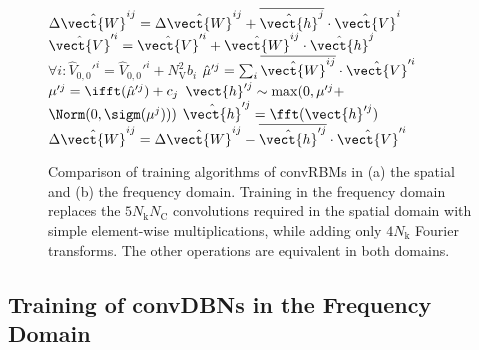 \begin{figure}[t!]
{\begin{minipage}{0.495\linewidth}
\begin{algorithm}[H]
{{     {
      $\Delta\hat{\vect{W}}^{ij} = \Delta\hat{\vect{W}}^{ij} +
      \overline{\hat{\vect{h}}^j} \cdot \hat{\vect{V}}^i$\;
      $\hat{\vect{V}}'^i = \hat{\vect{V}}'^i + \hat{\vect{W}}^{ij} \cdot
      \hat{\vect{h}}^j$\;
    }
  }
  $\forall i \colon \hat{V}_{0,0}'^i = \hat{V}_{0,0}'^i +
  N_\text{V}^2b_i$\;
   {
    $\hat{\mu}'^j = \sum_i \overline{\hat{\vect{W}}^{ij}} \cdot
    \hat{\vect{V}}'^i$\;
    $\mu'^j = \ifft(\hat{\mu}'^j) + c_j$\;
    $\vect{h}'^j \sim \max(0, \mu'^j +$ \\ \hfill $\Norm(0, \sigm(\mu^j)))$\;
    $\hat{\vect{h}}'^j = \fft(\vect{h}'^j)$\;
     {
      $\Delta\hat{\vect{W}}^{ij} = \Delta\hat{\vect{W}}^{ij} -
      \overline{\hat{\vect{h}}'^j} \cdot \hat{\vect{V}}'^i$\;
    }
  }
}
\end{algorithm}
\end{minipage}
}
\caption[Comparison of training algorithms of convRBMs in the
spatial and frequency domain]{Comparison of training algorithms of convRBMs in
(a) the spatial and (b) the frequency domain. Training in the frequency domain replaces the $5N_\text{k}N_\text{C}$ convolutions required in the spatial domain with simple
element-wise multiplications, while adding only $4N_\text{k}$ Fourier
transforms. The other operations are equivalent in both domains.}
\label{fig:algorithms}
\end{figure}

\subsection{Training of convDBNs in the Frequency Domain}

